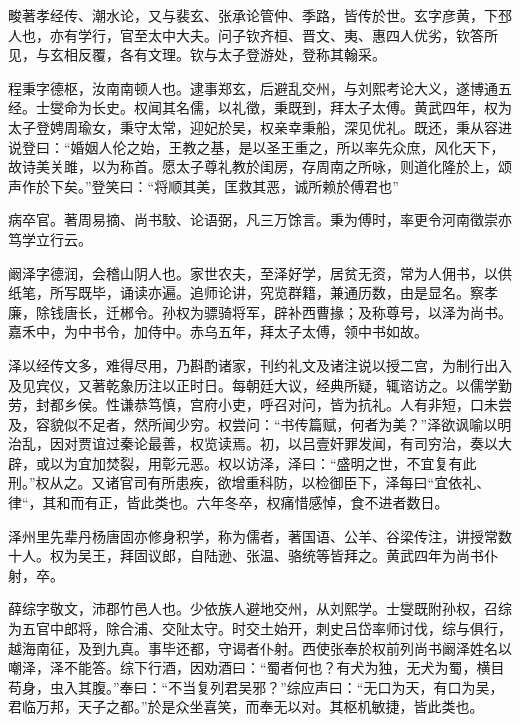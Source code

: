 \documentclass[12pt,UTF8]{ctexbook}
\begin{document}
畯著孝经传、潮水论，又与裴玄、张承论管仲、季路，皆传於世。玄字彦黄，下邳人也，亦有学行，官至太中大夫。问子钦齐桓、晋文、夷、惠四人优劣，钦答所见，与玄相反覆，各有文理。钦与太子登游处，登称其翰采。

程秉字德枢，汝南南顿人也。逮事郑玄，后避乱交州，与刘熙考论大义，遂博通五经。士燮命为长史。权闻其名儒，以礼徵，秉既到，拜太子太傅。黄武四年，权为太子登娉周瑜女，秉守太常，迎妃於吴，权亲幸秉船，深见优礼。既还，秉从容进说登曰：“婚姻人伦之始，王教之基，是以圣王重之，所以率先众庶，风化天下，故诗美关雎，以为称首。愿太子尊礼教於闺房，存周南之所咏，则道化隆於上，颂声作於下矣。”登笑曰：“将顺其美，匡救其恶，诚所赖於傅君也”

病卒官。著周易摘、尚书駮、论语弼，凡三万馀言。秉为傅时，率更令河南徵崇亦笃学立行云。

阚泽字德润，会稽山阴人也。家世农夫，至泽好学，居贫无资，常为人佣书，以供纸笔，所写既毕，诵读亦遍。追师论讲，究览群籍，兼通历数，由是显名。察孝廉，除钱唐长，迁郴令。孙权为骠骑将军，辟补西曹掾；及称尊号，以泽为尚书。嘉禾中，为中书令，加侍中。赤乌五年，拜太子太傅，领中书如故。

泽以经传文多，难得尽用，乃斟酌诸家，刊约礼文及诸注说以授二宫，为制行出入及见宾仪，又著乾象历注以正时日。每朝廷大议，经典所疑，辄谘访之。以儒学勤劳，封都乡侯。性谦恭笃慎，宫府小吏，呼召对问，皆为抗礼。人有非短，口未尝及，容貌似不足者，然所闻少穷。权尝问：“书传篇赋，何者为美？”泽欲讽喻以明治乱，因对贾谊过秦论最善，权览读焉。初，以吕壹奸罪发闻，有司穷治，奏以大辟，或以为宜加焚裂，用彰元恶。权以访泽，泽曰：“盛明之世，不宜复有此刑。”权从之。又诸官司有所患疾，欲增重科防，以检御臣下，泽每曰“宜依礼、律“，其和而有正，皆此类也。六年冬卒，权痛惜感悼，食不进者数日。

泽州里先辈丹杨唐固亦修身积学，称为儒者，著国语、公羊、谷梁传注，讲授常数十人。权为吴王，拜固议郎，自陆逊、张温、骆统等皆拜之。黄武四年为尚书仆射，卒。

薛综字敬文，沛郡竹邑人也。少依族人避地交州，从刘熙学。士燮既附孙权，召综为五官中郎将，除合浦、交阯太守。时交土始开，刺史吕岱率师讨伐，综与俱行，越海南征，及到九真。事毕还都，守谒者仆射。西使张奉於权前列尚书阚泽姓名以嘲泽，泽不能答。综下行酒，因劝酒曰：“蜀者何也？有犬为独，无犬为蜀，横目苟身，虫入其腹。”奉曰：“不当复列君吴邪？”综应声曰：“无口为天，有口为吴，君临万邦，天子之都。”於是众坐喜笑，而奉无以对。其枢机敏捷，皆此类也。
\end{document}
